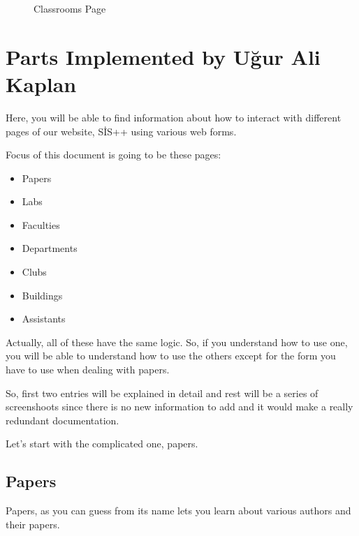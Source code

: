 \documentclass[letterpaper,10pt,english]{sphinxmanual}
\begin{document}
\begin{figure}[htbp]
\centering
\capstart

\noindent{}
\caption{Classrooms Page}\label{\detokenize{user/berkay:id10}}\end{figure}


\section{Parts Implemented by Uğur Ali Kaplan}
\label{\detokenize{user/kaplan:parts-implemented-by-ugur-ali-kaplan}}\label{\detokenize{user/kaplan::doc}}
Here, you will be able to find information about how to interact
with different pages of our website, SİS++ using various web forms.

Focus of this document is going to be these pages:
\begin{itemize}
\item {} 
Papers

\item {} 
Labs

\item {} 
Faculties

\item {} 
Departments

\item {} 
Clubs

\item {} 
Buildings

\item {} 
Assistants

\end{itemize}

Actually, all of these have the same logic. So, if you understand how
to use one, you will be able to understand how to use the others except
for the form you have to use when dealing with papers.

So, first two entries will be explained in detail and rest will be a series
of screenshoots since there is no new information to add and it would make
a really redundant documentation.

Let’s start with the complicated one, papers.


\subsection{Papers}
\label{\detokenize{user/kaplan:papers}}
Papers, as you can guess from its name lets you learn about various
authors and their papers.
\end{document}
